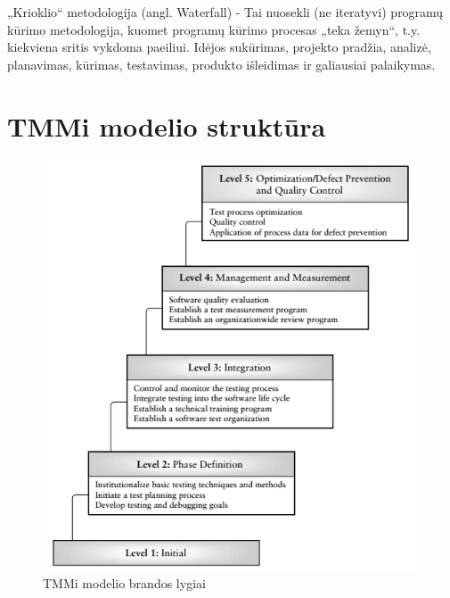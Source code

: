 \documentclass{VUMIFPSkursinis}
\begin{document}
„Krioklio“ metodologija (angl. Waterfall) - Tai nuosekli (ne iteratyvi) programų kūrimo metodologija, kuomet programų kūrimo procesas „teka žemyn“, t.y. kiekviena sritis vykdoma paeiliui. Idėjos sukūrimas, projekto pradžia, analizė, planavimas, kūrimas, testavimas, produkto išleidimas ir galiausiai palaikymas.

\appendix  %

\section{TMMi modelio struktūra}
\begin{figure}[H]
    \centering
    \includegraphics[scale=0.85]{img/TMMI}
    \caption{TMMi modelio brandos lygiai \cite{Burnstein:2010:PST:1965566}}
    \label{img:tmmi}
\end{figure}
\end{document}
